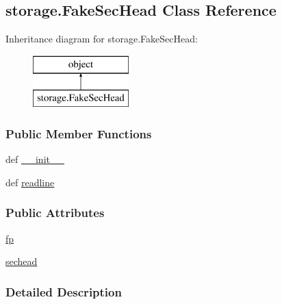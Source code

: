 \hypertarget{classstorage_1_1FakeSecHead}{\subsection{storage.\-Fake\-Sec\-Head Class Reference}
\label{classstorage_1_1FakeSecHead}
}
Inheritance diagram for storage.\-Fake\-Sec\-Head\-:\begin{figure}[H]
\begin{center}
\leavevmode
\includegraphics[height=2.000000cm]{classstorage_1_1FakeSecHead}
\end{center}
\end{figure}
\subsubsection*{Public Member Functions}
\begin{DoxyCompactItemize}
\item 
def \hyperlink{classstorage_1_1FakeSecHead_a6a57eb1adfb97de7d6246de6f3742226}{\-\_\-\-\_\-init\-\_\-\-\_\-}
\item 
def \hyperlink{classstorage_1_1FakeSecHead_a419fee3fa1ce40fc89d8743829e7eb45}{readline}
\end{DoxyCompactItemize}
\subsubsection*{Public Attributes}
\begin{DoxyCompactItemize}
\item 
\hyperlink{classstorage_1_1FakeSecHead_a568fc1a21d55931188b7dbb77f93b094}{fp}
\item 
\hyperlink{classstorage_1_1FakeSecHead_a34480f5cc048c82a51c460155a64aad1}{sechead}
\end{DoxyCompactItemize}


\subsubsection{Detailed Description}
 

